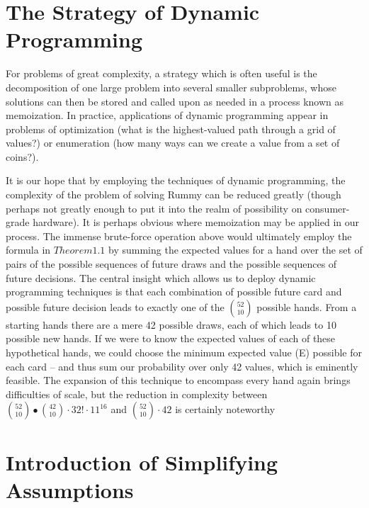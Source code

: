 \documentclass[paper=a4, fontsize=11pt,twoside]{report}   %
\begin{document}
\section{The Strategy of Dynamic Programming}

For problems of great complexity, a strategy which is often useful is the decomposition of one large problem into several smaller subproblems, whose solutions can then be stored and called upon as needed in a process known as memoization. In practice, applications of dynamic programming appear in problems of optimization (what is the highest-valued path through a grid of values?) or enumeration (how many ways can we create a value from a set of coins?). 

It is our hope that by employing the techniques of dynamic programming, the complexity of the problem of solving Rummy can be reduced greatly (though perhaps not greatly enough to put it into the realm of possibility on consumer-grade hardware). It is perhaps obvious where memoization may be applied in our process. The immense brute-force operation above would ultimately employ the formula in $Theorem 1.1$ by summing the expected values for a hand over the set of pairs of the possible sequences of future draws and the possible sequences of future decisions. The central insight which allows us to deploy dynamic programming techniques is that each combination of possible future card and possible future decision leads to exactly one of the $\binom{52}{10}$ possible hands. From a starting hands there are a mere 42 possible draws, each of which leads to 10 possible new hands. If we were to know the expected values of each of these hypothetical hands, we could choose the minimum expected value (E) possible for each card – and thus sum our probability over only 42 values, which is eminently feasible. The expansion of this technique to encompass every hand again brings difficulties of scale, but the reduction in complexity between $\binom{52}{10}∙\binom{42}{10} \cdot 32! \cdot 11^{16}$ and $\binom{52}{10}\cdot42$ is certainly noteworthy

\section{Introduction of Simplifying Assumptions}
\end{document}
